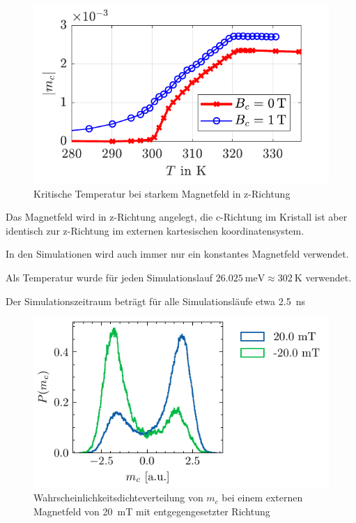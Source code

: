 \documentclass[main.tex]{subfiles}
\begin{document}

\begin{figure}[H]
    \centering
    \includegraphics{bilder/jschlege/Magnetization_z.pdf}
    \caption{Kritische Temperatur bei starkem Magnetfeld in z-Richtung \cite{schlegel-master}}\label{fig:high-bz-crit-temp}
\end{figure}


Das Magnetfeld wird in z-Richtung angelegt, die c-Richtung im Kristall ist aber identisch zur z-Richtung im externen kartesischen koordinatensystem.

In den Simulationen wird auch immer nur ein konstantes Magnetfeld verwendet.

Als Temperatur wurde für jeden Simulationslauf \( \SI{26.025}{\milli\electronvolt} \approx \SI{302}{\kelvin}\) verwendet.

Der Simulationszeitraum beträgt für alle Simulationsläufe etwa \SI{2.5}{\nano\s}

\begin{figure}[H]
    \centering
    \includegraphics{bilder/plots/Bz_sign_comparison/20mT_hist_comp.pdf}
    \caption{Wahrscheinlichkeitsdichteverteilung von \(m_c\) bei einem externen Magnetfeld von \SI{20}{\milli\tesla} mit entgegengesetzter Richtung}\label{fig:bz-sign-hist}
\end{figure}
\end{document}
